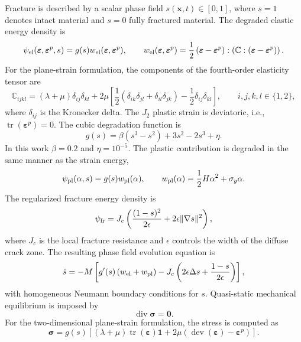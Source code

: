 \documentclass[pamm,a4paper,fleqn]{w-art}
\begin{document}
Fracture is described by a scalar phase field
\(s(\boldsymbol{x},t)\in[0,1]\), where \(s=1\) denotes intact
material and \(s=0\) fully fractured material. The degraded elastic
energy density is
\begin{equation}
  \psi_{\rm el}(
  \boldsymbol{\varepsilon},
  \boldsymbol{\varepsilon}^p,
  s)
  = g(s)w_{\rm el}(
  \boldsymbol{\varepsilon},
  \boldsymbol{\varepsilon}^p),
  \qquad
  w_{\rm el}(\boldsymbol{\varepsilon},\boldsymbol{\varepsilon}^p)
  = \frac{1}{2}
  \left(\boldsymbol{\varepsilon}-\boldsymbol{\varepsilon}^p\right)
  :
  \left(
  \boldsymbol{\mathbb{C}}:
  \left(
  \boldsymbol{\varepsilon}-\boldsymbol{\varepsilon}^p
  \right)
  \right).
\end{equation}
For the plane-strain formulation, the components of the fourth-order
elasticity tensor are
\begin{equation}
  \mathbb{C}_{ijkl}
  =(\lambda+\mu)\delta_{ij}\delta_{kl}
  +2\mu\left[
  \frac{1}{2}
  \left(\delta_{ik}\delta_{jl}+\delta_{il}\delta_{jk}\right)
  -\frac{1}{2}\delta_{ij}\delta_{kl}
  \right],
  \qquad i,j,k,l\in\{1,2\},
  \label{eq:plane_strain_elasticity_tensor}
\end{equation}
where \(\delta_{ij}\) is the Kronecker delta.
The \(J_2\) plastic strain is deviatoric, i.e.,
\(\operatorname{tr}(\boldsymbol{\varepsilon}^p)=0\).
The cubic degradation function is
\begin{equation}
  g(s)=\beta(s^3-s^2)+3s^2-2s^3+\eta .
  \label{eq:deg_grad}
\end{equation}
In this work \(\beta=0.2\) and \(\eta=10^{-5}\). The plastic
contribution is degraded in the same manner as the strain energy,
\begin{equation}
  \psi_{\rm pl}(\alpha,s)=g(s)w_{\rm pl}(\alpha),
  \qquad
  w_{\rm pl}(\alpha)=\frac{1}{2}H\alpha^2+\sigma_y\alpha .
\end{equation}
The regularized fracture energy density is
\begin{equation}
  \psi_{\rm fr}
  =J_c\left(
  \frac{(1-s)^2}{2\epsilon}
  +2\epsilon\|\nabla s\|^2
  \right),
\end{equation}
where \(J_c\) is the local fracture resistance and \(\epsilon\)
controls the width of the diffuse crack zone. The resulting phase
field evolution equation is
\begin{align}
  \dot{s}=-M\left[
    g'(s)\left(w_{\rm el}+w_{\rm pl}\right)
    -J_c\left(2\epsilon\Delta s+\frac{1-s}{2\epsilon}\right)
    \right],
  \label{eq:evolution_s}
\end{align}
with homogeneous Neumann boundary conditions for \(s\). Quasi-static
mechanical equilibrium is imposed by
\begin{equation}
  \operatorname{div}\boldsymbol{\sigma}=\boldsymbol{0}.
  \label{eq:equilibrium}
\end{equation}
For the two-dimensional plane-strain formulation, the stress is
computed as
\begin{equation}
  \boldsymbol{\sigma}=g(s)\left[
    (\lambda+\mu)
    \operatorname{tr}(\boldsymbol{\varepsilon})\boldsymbol{1}
    +2\mu\left(
    \operatorname{dev}(\boldsymbol{\varepsilon})
    -\boldsymbol{\varepsilon}^p
    \right)
    \right].
  \label{eq:sigma_plast}
\end{equation}
\end{document}

